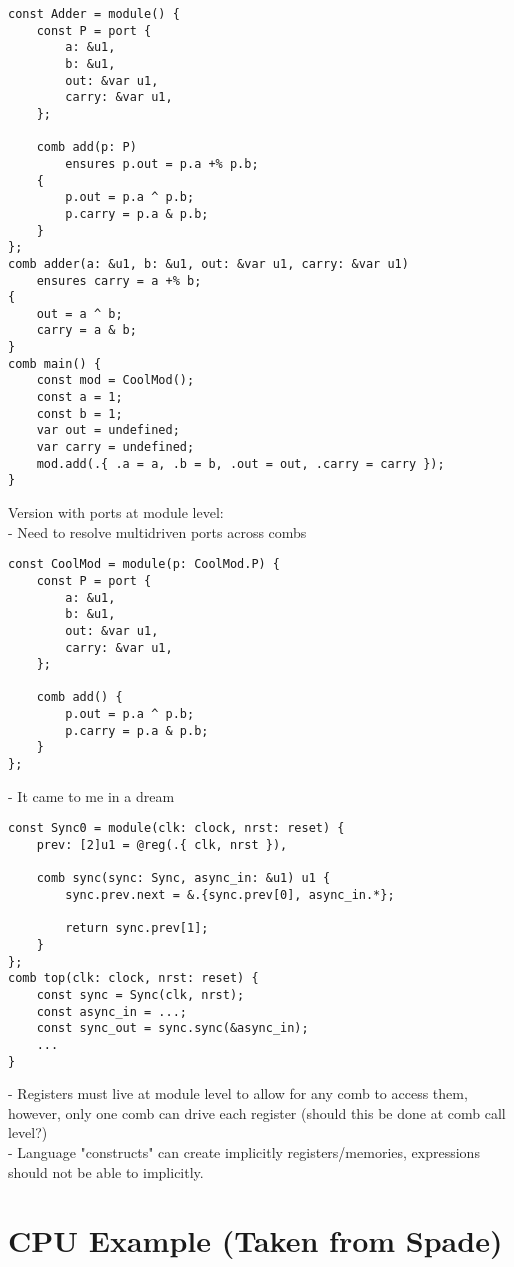 \documentclass[10pt]{article}
\begin{document}
\begin{verbatim}
const Adder = module() {
    const P = port {
        a: &u1,
        b: &u1,
        out: &var u1,
        carry: &var u1,
    };

    comb add(p: P) 
        ensures p.out = p.a +% p.b;
    {
        p.out = p.a ^ p.b; 
        p.carry = p.a & p.b;
    }
};
comb adder(a: &u1, b: &u1, out: &var u1, carry: &var u1)
    ensures carry = a +% b;
{
    out = a ^ b;
    carry = a & b;
}
comb main() {
    const mod = CoolMod();
    const a = 1;
    const b = 1;
    var out = undefined;
    var carry = undefined;
    mod.add(.{ .a = a, .b = b, .out = out, .carry = carry });
}
\end{verbatim}

Version with ports at module level: \\
- Need to resolve multidriven ports across combs
\begin{verbatim}
const CoolMod = module(p: CoolMod.P) {
    const P = port {
        a: &u1,
        b: &u1,
        out: &var u1,
        carry: &var u1,
    };

    comb add() {
        p.out = p.a ^ p.b; 
        p.carry = p.a & p.b;
    }
};
\end{verbatim}

- It came to me in a dream

\begin{verbatim}
const Sync0 = module(clk: clock, nrst: reset) {
    prev: [2]u1 = @reg(.{ clk, nrst }),

    comb sync(sync: Sync, async_in: &u1) u1 {
        sync.prev.next = &.{sync.prev[0], async_in.*};

        return sync.prev[1];
    }
};
comb top(clk: clock, nrst: reset) {
    const sync = Sync(clk, nrst);
    const async_in = ...;
    const sync_out = sync.sync(&async_in);
    ...
}
\end{verbatim}

- Registers must live at module level to allow for any comb to access them, however, only one comb
can drive each register (should this be done at comb call level?) \\
- Language "constructs" can create implicitly registers/memories, expressions should not be able to
implicitly.

\section{CPU Example (Taken from Spade)}
\end{document}
